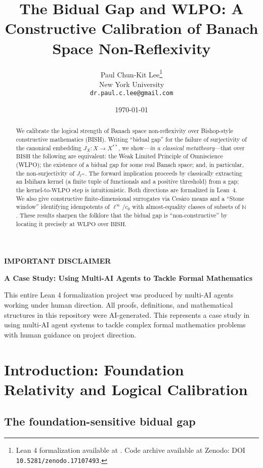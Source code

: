 \documentclass[11pt]{article}
\title{The Bidual Gap and WLPO: A Constructive Calibration of Banach Space Non-Reflexivity}
\author{Paul Chun-Kit Lee\thanks{Lean 4 formalization available at \leanRepo. Code archive available at Zenodo: DOI \texttt{10.5281/zenodo.17107493}.} \\ 
New York University \\ 
\texttt{dr.paul.c.lee@gmail.com}}
\date{\today}
\newcommand{\WLPO}{\mathrm{WLPO}}
\newcommand{\BISH}{\mathrm{BISH}}
\begin{document}
\begin{abstract}
We calibrate the logical strength of Banach space non-reflexivity over Bishop-style constructive mathematics (BISH). Writing ``bidual gap'' for the failure of surjectivity of the canonical embedding $J_X\!:X\to X^{**}$, we show---\emph{in a classical metatheory}---that over $\BISH$ the following are equivalent: the Weak Limited Principle of Omniscience (WLPO); the existence of a bidual gap for some real Banach space; and, in particular, the non-surjectivity of $J_{\ell^\infty}$. The forward implication proceeds by classically extracting an Ishihara kernel (a finite tuple of functionals and a positive threshold) from a gap; the kernel-to-$\WLPO$ step is intuitionistic. Both directions are formalized in Lean~4. We also give constructive finite-dimensional surrogates via Cesàro means and a ``Stone window'' identifying idempotents of $\ell^\infty/c_0$ with almost-equality classes of subsets of $\mathbb{N}$. These results sharpen the folklore that the bidual gap is ``non-constructive'' by locating it precisely at $\WLPO$ over $\BISH$.
\end{abstract}

\maketitle

\begin{mdframed}[backgroundcolor=gray!10, linewidth=0pt]
\textbf{IMPORTANT DISCLAIMER}

\textbf{A Case Study: Using Multi-AI Agents to Tackle Formal Mathematics}

This entire Lean 4 formalization project was produced by multi-AI agents working under human direction. All proofs, definitions, and mathematical structures in this repository were AI-generated. This represents a case study in using multi-AI agent systems to tackle complex formal mathematics problems with human guidance on project direction.
\end{mdframed}

\tableofcontents

\section{Introduction: Foundation Relativity and Logical Calibration}

\subsection{The foundation-sensitive bidual gap}
\end{document}
